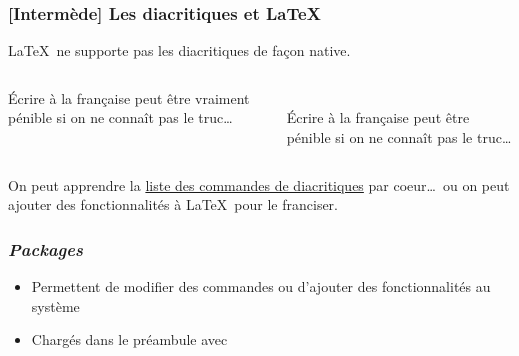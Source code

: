 
\begin{frame}[c,fragile]

	\frametitle{[Intermède] Les diacritiques et \LaTeX}
	
	\LaTeX\ ne supporte pas les diacritiques de façon native.
	
	\begin{columns}
	\begin{codesource}
	\'{E}crire \`{a} la fran\c{c}aise 
	peut \^{e}tre vraiment p\'{e}nible 
	si on ne conna\^{i}t pas le truc\dots
	\end{codesource}
		\\[4pt]
		Écrire à la française peut être pénible si on ne connaît pas le truc\dots
	\end{columns}

	On peut apprendre la \href{https://en.wikibooks.org/wiki/LaTeX/Special_Characters#Escaped_codes}%
	{liste des commandes de diacritiques} par coeur\dots\ ou on peut
	ajouter des fonctionnalités à \LaTeX\ pour le franciser.
\end{frame}


\begin{frame}[c,fragile]

	\frametitle{\emph{Packages}}
	
	\begin{itemize}
		\item Permettent de modifier des commandes ou d’ajouter des	fonctionnalités au système
		\item Chargés dans le préambule avec
		
	\begin{codesource}
	\usepackage{package}
	\usepackage[options]{package}
	\usepackage{package1,package2,...}
	\end{codesource}
	\end{itemize}
\end{frame}


